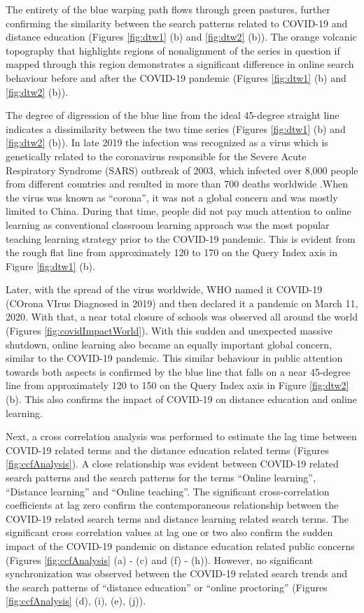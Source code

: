 \documentclass[11pt,a4paper,]{article}
\begin{document}
The entirety of the blue warping path flows through green pastures, further confirming the similarity between the search patterns related to COVID-19 and distance education (Figures \ref{fig:dtw1} (b) and \ref{fig:dtw2} (b)). The orange volcanic topography that highlights regions of nonalignment of the series in question if mapped through this region demonstrates a significant difference in online search behaviour before and after the COVID-19 pandemic (Figures \ref{fig:dtw1} (b) and \ref{fig:dtw2} (b)).

The degree of digression of the blue line from the ideal 45-degree straight line indicates a dissimilarity between the two time
series (Figures \ref{fig:dtw1} (b) and \ref{fig:dtw2} (b)). In late 2019 the infection was recognized as a virus which is genetically related to the coronavirus responsible for the Severe Acute Respiratory Syndrome (SARS) outbreak of 2003, which infected over 8,000 people from different countries and resulted in more than 700 deaths worldwide \autocite{ciotti2019covid}.When the virus was known as ``corona'', it was not a global concern and was mostly limited to China. During that time, people did not pay much attention to online learning as conventional classroom learning approach was the most popular teaching learning strategy prior to the COVID-19 pandemic. This is evident from the rough flat line from approximately 120 to 170 on the Query Index axis in Figure \ref{fig:dtw1} (b).

Later, with the spread of the virus worldwide, WHO named it COVID-19 (COrona VIrus Diagnosed in 2019) and then declared it a pandemic on March 11, 2020. With that, a near total closure of schools was observed all around the world (Figures \ref{fig:covidImpactWorld}). With this sudden and unexpected massive shutdown, online learning also became an equally important global concern, similar to the COVID-19 pandemic. This similar behaviour in public attention towards both aspects is confirmed by the blue line that falls on a near 45-degree line from approximately 120 to 150 on the Query Index axis in Figure \ref{fig:dtw2} (b). This also confirms the impact of COVID-19 on distance education and online learning.

Next, a cross correlation analysis was performed to estimate the lag time between COVID-19 related terms and the distance education related terms (Figures \ref{fig:ccfAnalysis}). A close relationship was evident between COVID-19 related search patterns and the search patterns for the terms ``Online learning'', ``Distance learning'' and ``Online teaching''. The significant cross-correlation coefficients at lag zero confirm the contemporaneous relationship between the COVID-19 related search terms and distance learning related search terms. The significant cross correlation values at lag one or two also confirm the sudden impact of the COVID-19 pandemic on distance education related public concerns (Figures \ref{fig:ccfAnalysis} (a) - (c) and (f) - (h)). However, no significant synchronization was observed between the COVID-19 related search trends and the search patterns of ``distance education'' or ``online proctoring'' (Figures \ref{fig:ccfAnalysis} (d), (i), (e), (j)).
\end{document}
